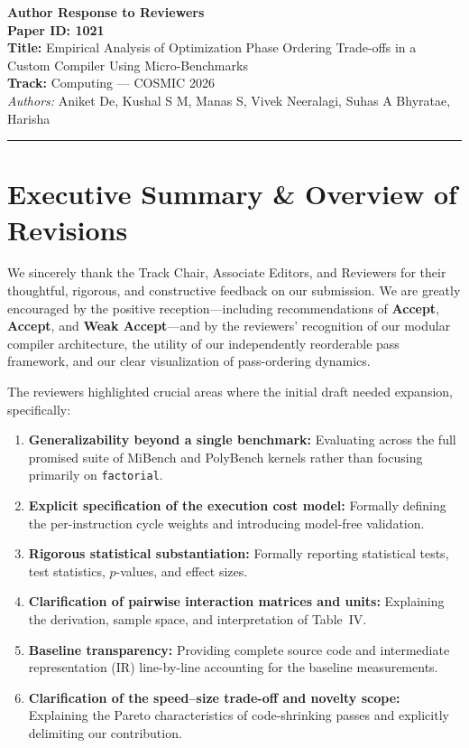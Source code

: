 \documentclass[10pt,a4paper]{article}
\begin{document}
\begin{center}
    {\LARGE \textbf{Author Response to Reviewers}}\\[1ex]
    {\large \textbf{Paper ID: 1021}}\\[0.5ex]
    \textbf{Title:} Empirical Analysis of Optimization Phase Ordering Trade-offs in a Custom Compiler Using Micro-Benchmarks\\[0.5ex]
    \textbf{Track:} Computing --- COSMIC 2026\\[0.5ex]
    \textit{Authors:} Aniket De, Kushal S M, Manas S, Vivek Neeralagi, Suhas A Bhyratae, Harisha
\end{center}

\vspace{0.5em}
\hrule
\vspace{1em}

\section*{Executive Summary \& Overview of Revisions}

We sincerely thank the Track Chair, Associate Editors, and Reviewers for their thoughtful, rigorous, and constructive feedback on our submission. We are greatly encouraged by the positive reception---including recommendations of \textbf{Accept}, \textbf{Accept}, and \textbf{Weak Accept}---and by the reviewers' recognition of our modular compiler architecture, the utility of our independently reorderable pass framework, and our clear visualization of pass-ordering dynamics.

The reviewers highlighted crucial areas where the initial draft needed expansion, specifically:
\begin{enumerate}[itemsep=1pt,parsep=0pt,topsep=2pt]
    \item \textbf{Generalizability beyond a single benchmark:} Evaluating across the full promised suite of MiBench and PolyBench kernels rather than focusing primarily on \texttt{factorial}.
    \item \textbf{Explicit specification of the execution cost model:} Formally defining the per-instruction cycle weights and introducing model-free validation.
    \item \textbf{Rigorous statistical substantiation:} Formally reporting statistical tests, test statistics, $p$-values, and effect sizes.
    \item \textbf{Clarification of pairwise interaction matrices and units:} Explaining the derivation, sample space, and interpretation of Table~IV.
    \item \textbf{Baseline transparency:} Providing complete source code and intermediate representation (IR) line-by-line accounting for the baseline measurements.
    \item \textbf{Clarification of the speed--size trade-off and novelty scope:} Explaining the Pareto characteristics of code-shrinking passes and explicitly delimiting our contribution.
\end{enumerate}
\end{document}
